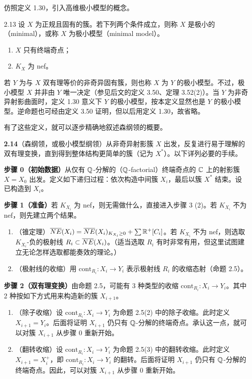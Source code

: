 仿照定义 1.30，引入高维极小模型的概念。

\begin{definition}{2.13}
设 $X$ 为正规且固有的簇。若下列两个条件成立，则称 $X$ 是极小的（minimal），或称 $X$ 为极小模型（minimal model）。
\begin{enumerate}[label=（\arabic*）,leftmargin=2.6em,itemsep=1pt]
\item $X$ 只有终端奇点；
\item $K_X$ 为 nef。
\end{enumerate}
若 $Y$ 为与 $X$ 双有理等价的非奇异固有簇，则也称 $X$ 为 $Y$ 的极小模型。不过，极小模型 $X$ 并非由 $Y$ 唯一决定（参见后文的定义 3.50、定理 3.52(2)）。当 $Y$ 为非奇异射影曲面时，定义 1.30 意义下 $Y$ 的极小模型，按本定义显然也是 $Y$ 的极小模型。逆命题也可经由定义 3.50 证明，但以后用定义 1.30，故省略。
\end{definition}

有了这些定义，就可以逐步精确地叙述森纲领的概要。

\par\medskip\noindent\textbf{2.14}（森纲领，或极小模型纲领）\quad 从非奇异射影簇 $X$ 出发，反复进行易于理解的双有理变换，直到得到整体结构更简单的簇（记为 $X^*$）。以下详列必要的手续。

\par\medskip\noindent\textbf{步骤 0（初始数据）}\quad 从仅有 $\mathbb{Q}$-分解的（$\mathbb{Q}$-factorial）终端奇点的 $\mathbb{C}$ 上的射影簇 $X=X_0$ 出发。定义如下递归过程：依次构造中间簇 $X_i$，最后以簇 $X^*$ 结束。设已构造到 $X_i$。

\par\medskip\noindent\textbf{步骤 1（准备）}\quad 若 $K_{X_i}$ 为 nef，则无需做什么，直接进入步骤 3 (2)。若 $K_{X_i}$ 不为 nef，则先建立两个结果。
\begin{enumerate}[label=（\arabic*）,leftmargin=2.6em,itemsep=1pt]
\item （锥定理）$\overline{NE}(X_i)=\overline{NE}(X_i)_{K_{X_i}\ge 0}+\sum\mathbb{R}^+[C_i]$。若 $K_{X_i}$ 不为 nef，则选取 $K_{X_i}$-负的极射线 $R_i\subset\overline{NE}(X_i)$。（适当选取 $R_i$ 有时非常有用，但这里试图建立无论怎样选取都能奏效的理论。）
\item （极射线的收缩）用 $\mathrm{cont}_{R_i}\colon X_i\to Y_i$ 表示极射线 $R_i$ 的收缩态射（命题 2.5）。
\end{enumerate}

\par\medskip\noindent\textbf{步骤 2（双有理变换）}\quad 由命题 2.5，可能有 3 种类型的收缩 $\mathrm{cont}_{R_i}\colon X_i\to Y_i$。其中 2 种按如下方式用来构造新的簇 $X_{i+1}$。
\begin{enumerate}[label=（\arabic*）,leftmargin=2.6em,itemsep=1pt]
\item （除子收缩）设 $\mathrm{cont}_{R_i}\colon X_i\to Y_i$ 为命题 2.5(2) 中的除子收缩。此时定义 $X_{i+1}=Y_i$。后面将证明 $X_{i+1}$ 仍只有 $\mathbb{Q}$-分解的终端奇点。承认这一点，就可以对簇 $X_{i+1}$ 从步骤 0 重新开始。
\item （翻转收缩）设 $\mathrm{cont}_{R_i}\colon X_i\to Y_i$ 为命题 2.5(3) 中的翻转收缩。此时定义 $X_{i+1}=X_i^+$，即 $\mathrm{cont}_{R_i}\colon X_i\to Y_i$ 的翻转。后面将证明 $X_{i+1}$ 仍只有 $\mathbb{Q}$-分解的终端奇点。因此，可以对簇 $X_{i+1}$ 从步骤 0 重新开始。
\end{enumerate}

